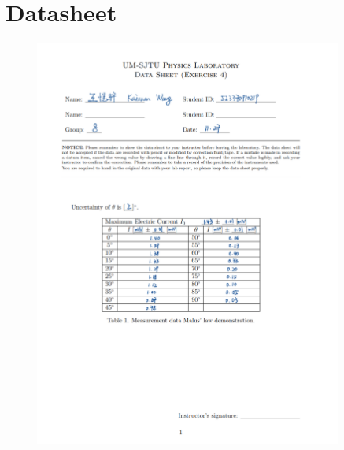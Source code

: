 \documentclass[12pt, a4paper, oneside]{article}
\begin{document}
\section{Datasheet}
\begin{figure}
	\centering
	\includegraphics[width=0.9\textwidth]{D1.png}
	\label{fig8}
\end{figure}
\end{document}
